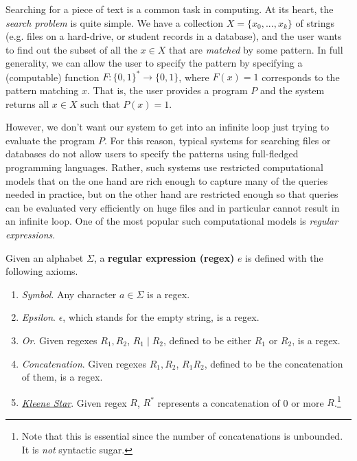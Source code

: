   Searching for a piece of text is a common task in computing. At its heart, the \textit{search problem} is quite simple. We have a collection $X = \{x_0, ..., x_k\}$ of strings (e.g. files on a hard-drive, or student records in a database), and the user wants to find out the subset of all the $x \in X$ that are \textit{matched} by some pattern. In full generality, we can allow the user to specify the pattern by specifying a (computable) function $F: \{0,1\}^* \to \{0,1\}$, where $F(x) = 1$ corresponds to the pattern matching $x$. That is, the user provides a program $P$ and the system returns all $x \in X$ such that $P(x) = 1$. 

  However, we don’t want our system to get into an infinite loop just trying to evaluate the program $P$. For this reason, typical systems for searching files or databases do not allow users to specify the patterns using full-fledged programming languages. Rather, such systems use restricted computational models that on the one hand are rich enough to capture many of the queries needed in practice, but on the other hand are restricted enough so that queries can be evaluated very efficiently on huge files and in particular cannot result in an infinite loop. One of the most popular such computational models is \textit{regular expressions}. 

  \begin{definition}
		\label{def:regular_expression}
    Given an alphabet $\Sigma$, a \textbf{regular expression (regex)} $e$ is defined with the following axioms. 
    \begin{enumerate}
      \item \textit{Symbol}. Any character $a \in \Sigma$ is a regex. 
      \item \textit{Epsilon}. $\epsilon$, which stands for the empty string, is a regex. 
      \item \textit{Or}. Given regexes $R_1, R_2$, $R_1 \mid R_2$, defined to be either $R_1$ or $R_2$, is a regex. 
      \item \textit{Concatenation}. Given regexes $R_1, R_2$, $R_1 R_2$, defined to be the concatenation of them, is a regex. 
      \item \textit{\hyperref[def:kleene-star]{Kleene Star}}. Given regex $R$, $R^\ast$ represents a concatenation of 0 or more $R$.\footnote{Note that this is essential since the number of concatenations is unbounded. It is \textit{not} syntactic sugar.}
    \end{enumerate}
  \end{definition}

